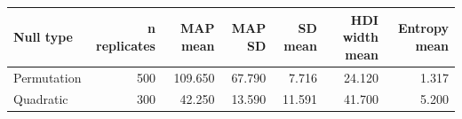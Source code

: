 \begin{tabular}{lrrrrrr}
\toprule
Null type & n replicates & MAP mean & MAP SD & SD mean & HDI width mean & Entropy mean \\
\midrule
Permutation & 500 & 109.650 & 67.790 & 7.716 & 24.120 & 1.317 \\
Quadratic & 300 & 42.250 & 13.590 & 11.591 & 41.700 & 5.200 \\
\bottomrule
\end{tabular}
